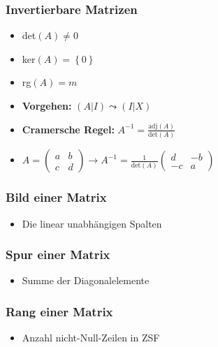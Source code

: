 \documentclass[ngerman,11pt,a4paper
,pdftex]{article}
\newcommand{\f}[1]{$#1$}
\theoremstyle{nodot}
\theoremstyle{nodot}
\begin{document}
\begin{multicols*}{3}
\begin{tcolorbox}[colback=white]
          \subsubsection*{Invertierbare Matrizen}
          \begin{itemize}
            \item det\f{(A)\neq0}
            \item ker\f{(A)=\left\{0\right\}} 
            \item rg\f{(A)=m}
            \item \textbf{Vorgehen: } \f{(A|I)\leadsto (I|X)}
            \item \textbf{Cramersche Regel: }\f{A^{-1}=\frac{\text{adj}(A)}{\text{det}(A)}}
            \item \f{A = \begin{pmatrix}a&b\\c&d\end{pmatrix} \rightarrow A^{-1}=\frac{1}{\text{det}(A)}\begin{pmatrix}d&-b\\-c&a\end{pmatrix}}
          \end{itemize}
        \end{tcolorbox}
        
        \begin{tcolorbox}[colback=white,bottom=10pt, top=10pt]
          \subsubsection*{Bild einer Matrix}
          \begin{itemize}
            \item Die linear unabhängigen Spalten
          \end{itemize}
          \subsubsection*{Spur einer Matrix}
          \begin{itemize}
            \item Summe der Diagonalelemente
          \end{itemize}
          \subsubsection*{Rang einer Matrix}
          \begin{itemize}
            \item Anzahl nicht-Null-Zeilen in ZSF
          \end{itemize}

\end{tcolorbox}
\end{multicols*}
\end{document}
